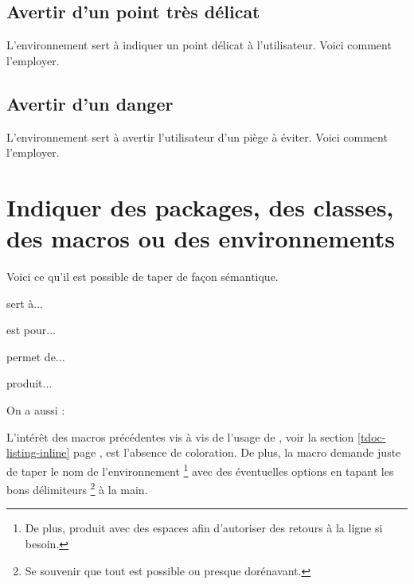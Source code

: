 \subsection{Avertir d'un point très délicat}

L'environnement  sert à indiquer un point délicat à  l'utilisateur. Voici comment l'employer.




\subsection{Avertir d'un danger}

L'environnement  sert à avertir l'utilisateur d'un piège à éviter. Voici comment l'employer.




\section{Indiquer des packages, des classes, des macros ou des environnements}

Voici ce qu'il est possible de taper de façon sémantique.


\begin{tdoclatex}[sbs]
 sert à...

 est pour...

 permet de...

 produit...

On a aussi :

\end{tdoclatex}


\begin{tdocrem}
    L'intérêt des macros précédentes vis à vis de l'usage de , voir la section \ref{tdoc-listing-inline} page \pageref{tdoc-listing-inline}, est l'absence de coloration.
    De plus, la macro  demande juste de taper le nom de l'environnement
    \footnote{
        De plus,  produit  avec des espaces afin d'autoriser des retours à la ligne si besoin.
    }
    avec des éventuelles options en tapant les bons délimiteurs
    \footnote{
        Se souvenir que tout est possible ou presque dorénavant.
    }
    à la main.
\end{tdocrem}


